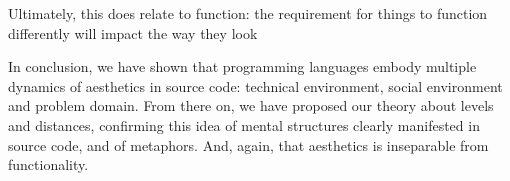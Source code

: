 Ultimately, this does relate to function: the requirement for things to function differently will impact the way they look

\spacer

In conclusion, we have shown that programming languages embody multiple dynamics of aesthetics in source code: technical environment, social environment and problem domain. From there on, we have proposed our theory about levels and distances, confirming this idea of mental structures clearly manifested in source code, and of metaphors. And, again, that aesthetics is inseparable from functionality.